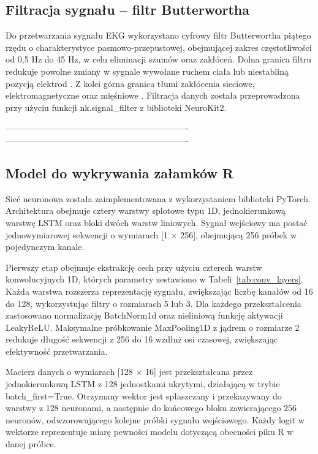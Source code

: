 \documentclass[journal]{IEEEtran}
\begin{document}
\subsection{Filtracja sygnału – filtr Butterwortha}
Do przetwarzania sygnału EKG wykorzystano cyfrowy filtr Butterwortha piątego rzędu o charakterystyce pasmowo-przepustowej, obejmującej zakres częstotliwości od 0,5 Hz do 45 Hz, w celu eliminacji szumów oraz zakłóceń. Dolna granica filtru redukuje powolne zmiany w sygnale wywołane ruchem ciała lub niestabliną pozycją elektrod  \cite{4}. Z kolei górna granica tłumi zakłócenia sieciowe, elektromagnetyczne oraz mięśniowe  \cite{5}. Filtracja danych została przeprowadzona przy użyciu funkcji nk.signal\_filter z biblioteki NeuroKit2.


----------------------------------------------------------------
----------------------------------------------------------------

\newpage
\subsection{Model do wykrywania załamków R}
Sieć neuronowa została zaimplementowana z wykorzystaniem biblioteki PyTorch. Architektura obejmuje cztery warstwy splotowe typu 1D, jednokierunkową warstwę LSTM oraz bloki dwóch warstw liniowych. Sygnał wejściowy ma postać jednowymiarowej sekwencji o wymiarach [1 × 256], obejmującą 256 próbek w pojedynczym kanale.

Pierwszy etap obejmuje ekstrakcję cech przy użyciu czterech warstw konwolucyjnych 1D, których parametry zestawiono w Tabeli~\ref{tab:conv_layers}. Każda warstwa rozszerza reprezentację sygnału, zwiększając liczbę kanałów od 16 do 128, wykorzystując filtry o rozmiarach 5 lub 3. Dla każdego przekształcenia zastosowano normalizację BatchNorm1d oraz nieliniową funkcję aktywacji LeakyReLU. Maksymalne próbkowanie MaxPooling1D z jądrem o rozmiarze 2 redukuje długość sekwencji z 256 do 16 wzdłuż osi czasowej, zwiększając efektywność przetwarzania.

Macierz danych o wymiarach [128 × 16] jest przekształcana przez jednokierunkową LSTM z 128 jednostkami ukrytymi, działającą w trybie batch\_first=True. Otrzymany wektor jest spłaszczany i przekazywany do warstwy z 128 neuronami, a następnie do końcowego bloku zawierającego 256 neuronów, odwzorowującego kolejne próbki sygnału wejściowego. Każdy logit w wektorze reprezentuje miarę pewności modelu dotyczącą obecności piku R w danej próbce.
\end{document}
